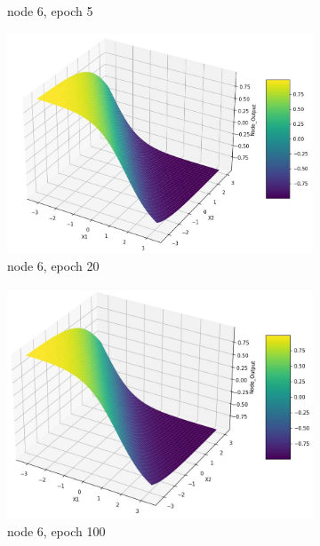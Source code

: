 \documentclass[11pt]{article}
\begin{document}
\begin{figure}[h!]
\begin{subfigure}[b]{0.3\textwidth}
	\caption{node 6, epoch 5}
	\label{fig:fig2.1.5.7}
	\end{subfigure}
	\begin{subfigure}[b]{0.3\textwidth}
	\centering
	\includegraphics[scale=0.14]{hidden1_n6_e20.jpg}
	\caption{node 6, epoch 20}
	\label{fig:fig2.1.5.8}
	\end{subfigure}
	\begin{subfigure}[b]{0.45\textwidth}
	\centering
	\includegraphics[scale=0.14]{hidden1_n6_e100.jpg}
	\caption{node 6, epoch 100}
	\label{fig:fig2.1.5.9}
	\end{subfigure}
	\begin{subfigure}[b]{0.45\textwidth}
	\centering

\end{subfigure}
\end{figure}
\end{document}
